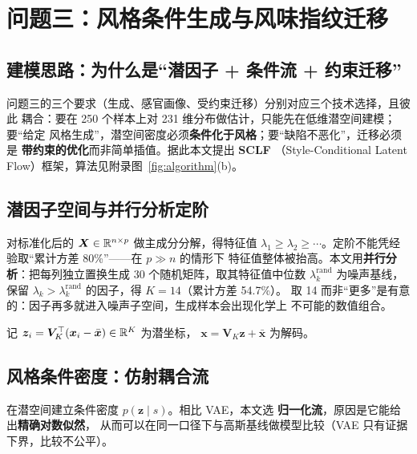 \section{问题三：风格条件生成与风味指纹迁移}

\subsection{建模思路：为什么是“潜因子 + 条件流 + 约束迁移”}

问题三的三个要求（生成、感官画像、受约束迁移）分别对应三个技术选择，且彼此
耦合：要在 250 个样本上对 231 维分布做估计，只能先在低维潜空间建模；要“给定
风格生成”，潜空间密度必须\textbf{条件化于风格}；要“缺陷不恶化”，迁移必须是
\textbf{带约束的优化}而非简单插值。据此本文提出 \textbf{SCLF}
（Style-Conditional Latent Flow）框架，算法见附录图~\ref{fig:algorithm}(b)。

\subsection{潜因子空间与并行分析定阶}

对标准化后的 $\bm{X}\in\mathbb{R}^{n\times p}$ 做主成分分解，得特征值 $\lambda_1\ge
\lambda_2\ge\cdots$。定阶不能凭经验取“累计方差 80\%”——在 $p\gg n$ 的情形下
特征值整体被抬高。本文用\textbf{并行分析}\cite{horn1965}：把每列独立置换生成
30 个随机矩阵，取其特征值中位数 $\lambda^{\mathrm{rand}}_k$ 为噪声基线，保留
$\lambda_k>\lambda^{\mathrm{rand}}_k$ 的因子，得 $K=14$（累计方差 54.7\%）。
取 14 而非“更多”是有意的：因子再多就进入噪声子空间，生成样本会出现化学上
不可能的数值组合。

记 $\bm{z}_i=\bm{V}_K^{\top}(\bm{x}_i-\bar{\bm{x}})\in\mathbb{R}^{K}$ 为潜坐标，
$\bm{x}=\bm{V}_K\bm{z}+\bar{\bm{x}}$ 为解码。

\subsection{风格条件密度：仿射耦合流}

在潜空间建立条件密度 $p(\bm{z}\mid s)$。相比 VAE\cite{kingma2014}，本文选
\textbf{归一化流}\cite{dinh2017}，原因是它能给出\textbf{精确对数似然}，
从而可以在同一口径下与高斯基线做模型比较（VAE 只有证据下界，比较不公平）。


